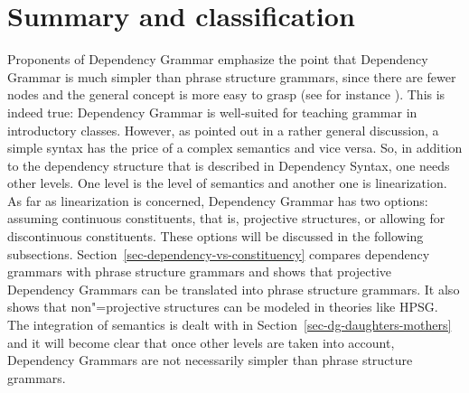 



\section{Summary and classification}




Proponents of Dependency Grammar emphasize the point that Dependency Grammar is much simpler than
phrase structure grammars, since there are fewer nodes and the general concept is more easy to
grasp (see for instance \citealp[Section~3.2, Section~7]{Osborne2014a-u}). This is indeed true: Dependency Grammar is well-suited for teaching grammar in
introductory classes. However, as \citet[]{SR2012a} pointed out in a rather general
discussion, a simple syntax has the price of a complex semantics and vice versa. So, in addition to
the dependency structure that is described in Dependency Syntax, one needs other levels. One level
is the level of semantics and another one is linearization. As far as linearization is concerned,
Dependency Grammar has two options: assuming continuous constituents, that is, projective structures,
or allowing for discontinuous constituents. These options will be discussed in the following subsections.
Section~\ref{sec-dependency-vs-constituency} compares dependency grammars with phrase structure
grammars and shows that projective Dependency Grammars can be translated into phrase structure
grammars. It also shows that non"=projective structures can be modeled in theories like HPSG.
The integration of semantics is dealt with in Section~\ref{sec-dg-daughters-mothers} and it will become clear that once other
levels are taken into account, Dependency Grammars are not necessarily simpler than phrase structure grammars.


